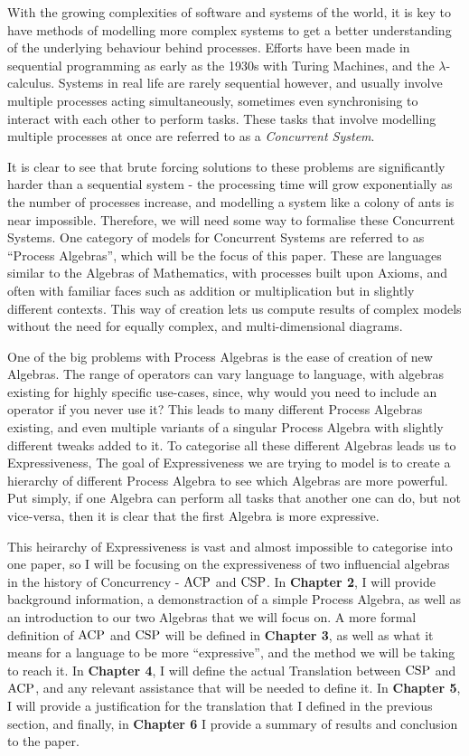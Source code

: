 \documentclass[../hons_project.tex]{subfiles}
\begin{document}
With the growing complexities of software and systems of the world, it is key to have methods of modelling more complex systems to get a better understanding of the underlying behaviour behind processes. Efforts have been made in sequential programming as early as the 1930s with Turing Machines, and the $\lambda$-calculus. Systems in real life are rarely sequential however, and usually involve multiple processes acting simultaneously, sometimes even synchronising to interact with each other to perform tasks. These tasks that involve modelling multiple processes at once are referred to as a \textit{Concurrent System}. 

It is clear to see that brute forcing solutions to these problems are significantly harder than a sequential system - the processing time will grow exponentially as the number of processes increase, and modelling a system like a colony of ants is near impossible. Therefore, we will need some way to formalise these Concurrent Systems. One category of models for Concurrent Systems are referred to as ``Process Algebras'', which will be the focus of this paper. These are languages similar to the Algebras of Mathematics, with processes built upon Axioms, and often with familiar faces such as addition or multiplication but in slightly different contexts. This way of creation lets us compute results of complex models without the need for equally complex, and multi-dimensional diagrams.

One of the big problems with Process Algebras is the ease of creation of new Algebras. The range of operators can vary language to language, with algebras existing for highly specific use-cases, since, why would you need to include an operator if you never use it? This leads to many different Process Algebras existing, and even multiple variants of a singular Process Algebra with slightly different tweaks added to it. To categorise all these different Algebras leads us to Expressiveness, The goal of Expressiveness we are trying to model is to create a hierarchy of different Process Algebra to see which Algebras are more powerful. Put simply, if one Algebra can perform all tasks that another one can do, but not vice-versa, then it is clear that the first Algebra is more expressive.

This heirarchy of Expressiveness is vast and almost impossible to categorise into one paper, so I will be focusing on the expressiveness of two influencial algebras in the history of Concurrency - $\mathrm{ACP}$ and $\mathrm{CSP}$. In \textbf{Chapter 2}, I will provide background information, a demonstraction of a simple Process Algebra, as well as an introduction to our two Algebras that we will focus on. A more formal definition of $\mathrm{ACP}$ and $\mathrm{CSP}$ will be defined in \textbf{Chapter 3}, as well as what it means for a language to be more ``expressive'', and the method we will be taking to reach it. In \textbf{Chapter 4}, I will define the actual Translation between $\mathrm{CSP}$ and $\mathrm{ACP}$, and any relevant assistance that will be needed to define it. In \textbf{Chapter 5}, I will provide a justification for the translation that I defined in the previous section, and finally, in \textbf{Chapter 6} I provide a summary of results and conclusion to the paper.
\end{document}
